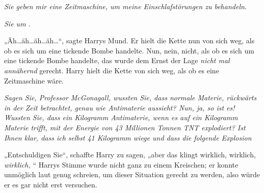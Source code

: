 \emph{Sie geben mir eine \emph{Zeitmaschine}, um meine \emph{Einschlafstörungen} zu behandeln.}

\emph{Sie  um .}

„Äh…äh…äh…äh…“, sagte Harrys Mund. Er hielt die Kette nun von sich weg, als ob es sich um eine tickende Bombe handelte. Nun, nein, nicht, als ob es sich um eine tickende Bombe handelte, das wurde dem Ernst der Lage \emph{nicht mal annähernd} gerecht. Harry hielt die Kette von sich weg, als ob es eine Zeitmaschine wäre.

\emph{Sagen Sie, Professor McGonagall, wussten Sie, dass normale Materie, rückwärts in der Zeit betrachtet, genau wie Antimaterie aussieht? Nun, ja, so ist es! Wussten Sie, dass ein Kilogramm Antimaterie, wenn es auf ein Kilogramm Materie trifft, mit der Energie von 43 Millionen Tonnen TNT explodiert? Ist Ihnen klar, dass ich selbst 41 Kilogramm wiege und dass die folgende Explosion }%

„Entschuldigen Sie“, schaffte Harry zu sagen, „aber das klingt wirklich, wirklich, \emph{wirklich, }“ Harrys Stimme wurde nicht ganz zu einem Kreischen; er konnte unmöglich laut genug schreien, um dieser Situation gerecht zu werden, also würde er es gar nicht erst versuchen.

